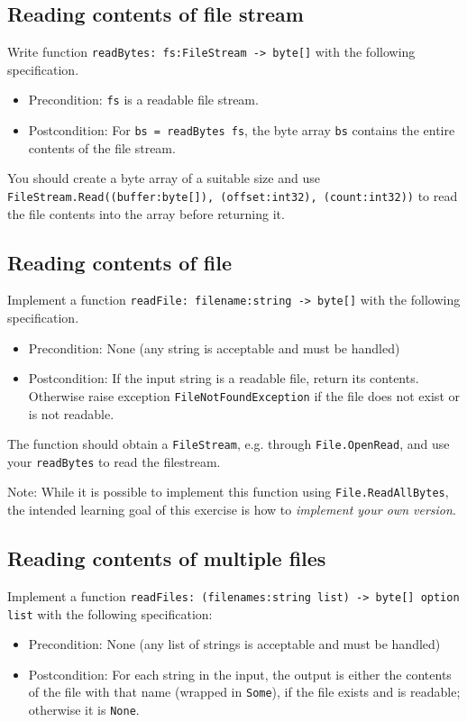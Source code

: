 \subsection*{Reading contents of file stream}

Write function \texttt{readBytes: fs:FileStream -> byte[]} with the following specification.  
\begin{itemize}
\item Precondition: \texttt{fs} is a readable file stream.
\item Postcondition: For \texttt{bs = readBytes fs}, the byte array \texttt{bs} contains the entire contents of the file stream.   
\end{itemize}

You should create a byte array of a suitable size and use \texttt{FileStream.Read((buffer:byte[]), (offset:int32), (count:int32))} to read the file contents into the array before returning it.

\subsection*{Reading contents of file}

Implement a function \texttt{readFile: filename:string -> byte[]} with the following specification. 
\begin{itemize}
\item Precondition: None (any string is acceptable and must be handled)
\item Postcondition: If the input string is a readable file, return its contents.  Otherwise raise exception \texttt{FileNotFoundException} if the file does not exist or is not readable.
\end{itemize}

The function should obtain a \texttt{FileStream}, e.g. through \texttt{File.OpenRead}, and use your \texttt{readBytes} to read the filestream.

Note: While it is possible to implement this function using \texttt{File.ReadAllBytes}, the intended learning goal of this exercise is how to \textit{implement your own version}.

\subsection*{Reading contents of multiple files}
 
Implement a function \texttt{readFiles: (filenames:string list) -> byte[] option list} with the following specification:
\begin{itemize}
\item Precondition: None (any list of strings is acceptable and must be handled)
\item Postcondition: For each string in the input, the output is either the contents of the file with that name (wrapped in \texttt{Some}), if the file exists and is readable; otherwise it is \texttt{None}.  
\end{itemize}

